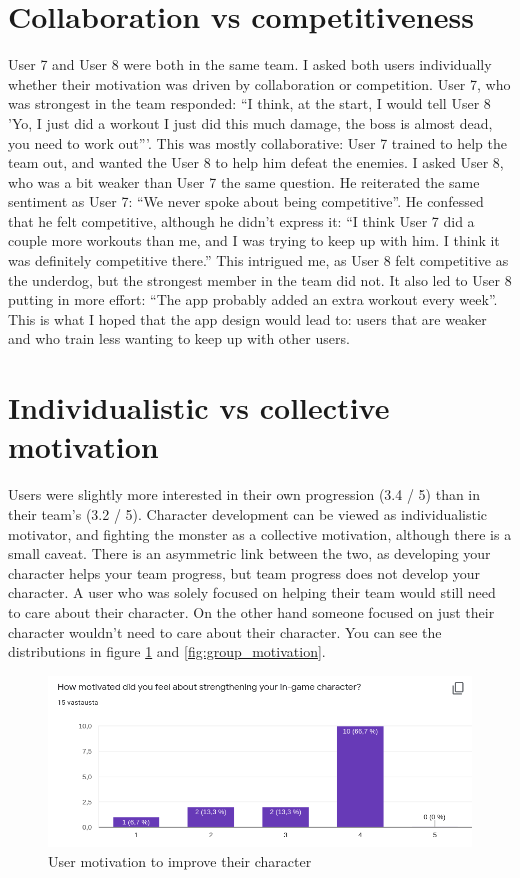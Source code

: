\documentclass{l4proj}
\begin{document}
\section{Collaboration vs competitiveness}
User 7 and User 8 were both in the same team. I asked both users individually whether their motivation was driven by collaboration or competition. User 7, who was strongest in the team responded: ``I think, at the start, I would tell User 8 'Yo, I just did a workout I just did this much damage, the boss is almost dead, you need to work out'''. This was mostly collaborative: User 7 trained to help the team out, and wanted the User 8 to help him defeat the enemies. I asked User 8, who was a bit weaker than User 7 the same question. He reiterated the same sentiment as User 7: ``We never spoke about being competitive''.  He confessed that he felt competitive, although he didn't express it: ``I think User 7 did a couple more workouts than me, and I was trying to keep up with him. I think it was definitely competitive there.'' This intrigued me, as User 8 felt competitive as the underdog, but the strongest member in the team did not. It also led to User 8 putting in more effort: ``The app probably added an extra workout every week''. This is what I hoped that the app design would lead to: users that are weaker and who train less wanting to keep up with other users.


\section{Individualistic vs collective motivation}
Users were slightly more interested in their own progression (3.4 / 5) than in their team's (3.2 / 5). Character development can be viewed as individualistic motivator, and fighting the monster as a collective motivation, although there is a small caveat. There is an asymmetric link between the two, as developing your character helps your team progress, but team progress does not develop your character. A user who was solely focused on helping their team would still need to care about their character. On the other hand someone focused on just their character wouldn't need to care about their character. You can see the distributions in figure \ref{fig:character_motivation} and \ref{fig:group_motivation}.
\begin{figure}[H]
    \centering
    \includegraphics[width=1.0\linewidth]{ingame.png}    
    \caption{User motivation to improve their character}
    \label{fig:character_motivation} 
\end{figure}
\end{document}
